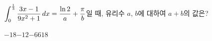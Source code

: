 \hspace*{2mm}\begin{minipage}[t]{\dimexpr\linewidth-2mm\relax}\vspace{0pt}
$\displaystyle\int_{0}^{\frac{1}{3}}\dfrac{3x-1}{9x^2+1}\mkern3mu dx=\dfrac{\ln 2}{a}+\dfrac{\pi}{b}$일 때, 유리수 $a$, $b$에 대하여 $a+b$의 값은?
\begin{choices32}{$-18$}{$-12$}{$-6$}{$6$}{$18$}\end{choices32}\end{minipage}
